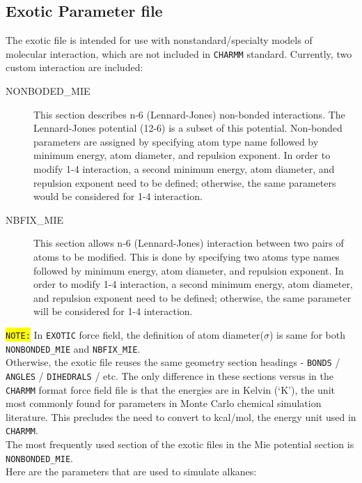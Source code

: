 \subsection{Exotic Parameter file}
The exotic file is intended for use with nonstandard/specialty models of molecular interaction, which are not included in \texttt{CHARMM} standard. Currently, two custom interaction are included:
\begin{description}
\item [NONBODED\_MIE] This section describes n-6 (Lennard-Jones) non-bonded interactions. The Lennard-Jones potential (12-6) is a subset of this potential. Non-bonded parameters are assigned by specifying atom type name followed by minimum energy, atom diameter, and repulsion exponent. In order to modify 1-4 interaction, a second minimum energy, atom diameter, and repulsion exponent need to be defined; otherwise, the same parameters would be considered for 1-4 interaction.
\item [NBFIX\_MIE] This section allows n-6 (Lennard-Jones) interaction between two pairs of atoms to be modified. This is done by specifying two atoms type names followed by minimum energy, atom diameter, and repulsion exponent. In order to modify 1-4 interaction, a second minimum energy, atom diameter, and repulsion exponent need to be defined; otherwise, the same parameter will be considered for 1-4 interaction.
\end{description}
\colorbox{yellow}{\texttt{NOTE:}} In \texttt{EXOTIC} force field, the definition of atom diameter($\sigma$) is same for both \texttt{NONBONDED\_MIE} and \texttt{NBFIX\_MIE}.\\
Otherwise, the exotic file reuses the same geometry section headings - \texttt{BONDS} / \texttt{ANGLES} / \texttt{DIHEDRALS} / etc. The only difference in these sections versus in the \texttt{CHARMM} format force field file is that the energies are in Kelvin (`K'), the unit most commonly found for parameters in Monte Carlo chemical simulation literature. This precludes the need to convert to kcal/mol, the energy unit used in \texttt{CHARMM}.\\ The most frequently used section of the exotic files in the Mie potential section is \texttt{NONBONDED\_MIE}.\\
Here are the parameters that are used to simulate alkanes:\\\\
